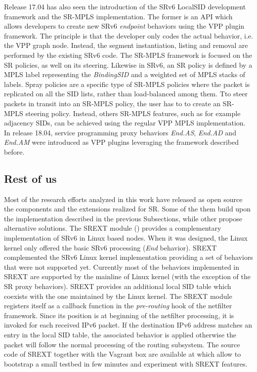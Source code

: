 Release 17.04 has also seen the introduction of the SRv6 LocalSID development framework and the SR-MPLS implementation. The former is an API which allows developers to create new SRv6 \textit{endpoint} behaviors using the VPP plugin framework. The principle is that the developer only codes the actual behavior, i.e. the VPP graph node. Instead, the segment instantiation, listing and removal are performed by the existing SRv6 code. The SR-MPLS framework is focused on the SR policies, as well on its steering. Likewise in SRv6, an SR policy is defined by a MPLS label representing the \textit{BindingSID} and a weighted set of MPLS stacks of labels. Spray policies are a specific type of SR-MPLS policies where the packet is replicated on all the SID lists, rather than load-balanced among them. Tto steer packets in transit into an SR-MPLS policy, the user has to to create an SR-MPLS steering policy. Instead, others SR-MPLS features, such as for example adjacency SIDs, can be achieved using the regular VPP MPLS implementation. In release 18.04, service programming proxy behaviors \textit{End.AS}, \textit{End.AD} and \textit{End.AM} were introduced as VPP plugins leveraging the framework described before.

\subsection{Rest of us}
\label{sec:rest}

Most of the research efforts analyzed in this work have released as open source the components and the extensions realized for SR. Some of the them build upon the implementation described in the previous Subsections, while other propose alternative solutions. The SREXT module (\cite{implementationof}) provides a complementary implementation of SRv6 in Linux based nodes. When it was designed, the Linux kernel only offered the basic SRv6 processing (\textit{End} behavior). SREXT complemented the SRv6 Linux kernel implementation providing a set of behaviors that were not supported yet. Currently most of the behaviors implemented in SREXT are supported by the mainline of Linux kernel (with the exception of the SR proxy behaviors). SREXT provides an additional local SID table which coexists with the one maintained by the Linux kernel. The SREXT module registers itself as a callback function in the \textit{pre-routing} hook of the netfilter \cite{netfilter} framework. Since its position is at beginning of the netfilter processing, it is invoked for each received IPv6 packet. If the destination IPv6 address matches an entry in the local SID table, the associated behavior is applied otherwise the packet will follow the normal processing of the routing subsystem. The source code of SREXT together with the Vagrant box are available at \cite{srext-home} which allow to bootstrap a small testbed in few minutes and experiment with SREXT features.

